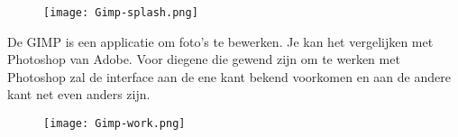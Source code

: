 \begin{figure}[H]
\texttt{[image: Gimp-splash.png]}
\end{figure}

De GIMP is een applicatie om foto's te bewerken. Je kan het vergelijken met Photoshop van Adobe. Voor diegene die gewend zijn om te werken met Photoshop zal de interface aan de ene kant bekend voorkomen en aan de andere kant net even anders zijn.

\begin{figure}[H]
\texttt{[image: Gimp-work.png]}
\end{figure}
